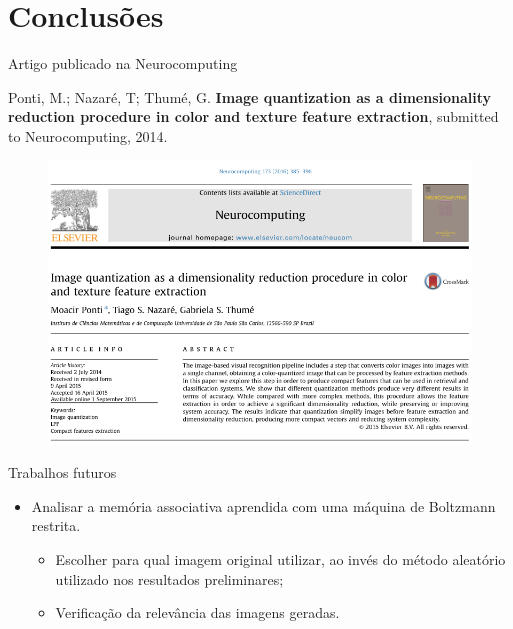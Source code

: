 \documentclass{beamer}
\begin{document}
\section{Conclusões}
\begin{frame}{Artigo publicado na Neurocomputing}

\begin{block}{}
\justifying
\tiny{
Ponti, M.; Nazaré, T; Thumé, G. \textbf{Image quantization as a dimensionality reduction procedure in color and texture feature extraction}, submitted to Neurocomputing, 2014.}
\end{block}
\begin{figure}
  \begin{center}
    \includegraphics[width=0.7\linewidth]{figuras/artigo.png}
  \end{center}
\end{figure}
\end{frame}
\begin{frame}{Trabalhos futuros}
\setlength\leftmargini{0em}
\justifying
  \begin{itemize}
  \item Analisar a memória associativa aprendida com uma máquina de Boltzmann restrita.
  \begin{itemize}
    \item Escolher para qual imagem original utilizar, ao invés do método aleatório utilizado nos resultados preliminares;
    \item Verificação da relevância das imagens geradas.
  \end{itemize}
  \end{itemize}
\end{frame}
\end{document}
